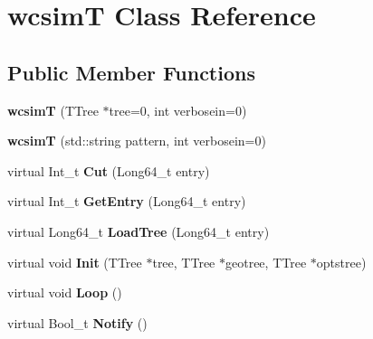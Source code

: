 \hypertarget{classwcsimT}{
\section{wcsimT Class Reference}
\label{classwcsimT}
}
\subsection*{Public Member Functions}
\begin{DoxyCompactItemize}
\item 
\hypertarget{classwcsimT_a6366d7ce15c5f09b4182cb39fe30f91c}{
{\bfseries wcsimT} (TTree $\ast$tree=0, int verbosein=0)}
\label{classwcsimT_a6366d7ce15c5f09b4182cb39fe30f91c}

\item 
\hypertarget{classwcsimT_a9cfff7ab16770bb3c19b97f3900fcae2}{
{\bfseries wcsimT} (std::string pattern, int verbosein=0)}
\label{classwcsimT_a9cfff7ab16770bb3c19b97f3900fcae2}

\item 
\hypertarget{classwcsimT_a4de22d05400624f68eb1f808fe88f6a0}{
virtual Int\_\-t {\bfseries Cut} (Long64\_\-t entry)}
\label{classwcsimT_a4de22d05400624f68eb1f808fe88f6a0}

\item 
\hypertarget{classwcsimT_abbbe6aa0005a4948665459c9132537eb}{
virtual Int\_\-t {\bfseries GetEntry} (Long64\_\-t entry)}
\label{classwcsimT_abbbe6aa0005a4948665459c9132537eb}

\item 
\hypertarget{classwcsimT_a61c8294ba48667515ab9d413ab2ec8bb}{
virtual Long64\_\-t {\bfseries LoadTree} (Long64\_\-t entry)}
\label{classwcsimT_a61c8294ba48667515ab9d413ab2ec8bb}

\item 
\hypertarget{classwcsimT_a533ca19b17d706dde4a226956f61b873}{
virtual void {\bfseries Init} (TTree $\ast$tree, TTree $\ast$geotree, TTree $\ast$optstree)}
\label{classwcsimT_a533ca19b17d706dde4a226956f61b873}

\item 
\hypertarget{classwcsimT_a0bdc362c8cf801cbb1310ecf1bb182fc}{
virtual void {\bfseries Loop} ()}
\label{classwcsimT_a0bdc362c8cf801cbb1310ecf1bb182fc}

\item 
\hypertarget{classwcsimT_ae8883788389c97cbd1e41401deb48f84}{
virtual Bool\_\-t {\bfseries Notify} ()}
\label{classwcsimT_ae8883788389c97cbd1e41401deb48f84}


\end{DoxyCompactItemize}
